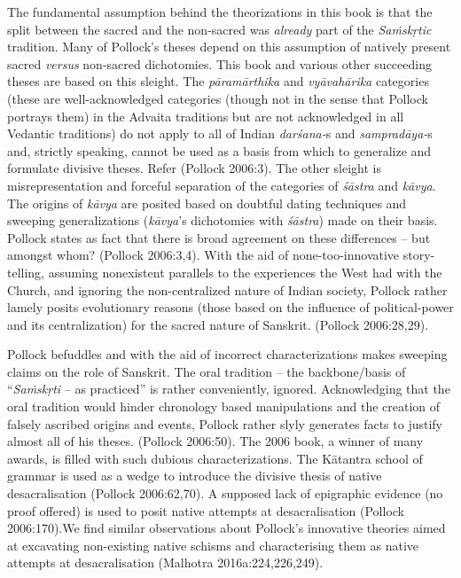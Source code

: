 The fundamental assumption behind the theorizations in this book is that the split between the sacred and the non-sacred was \textit{already} part of the \textit{Saṁskṛtic} tradition. Many of Pollock's theses depend on this assumption of natively present sacred \textit{versus} non-sacred dichotomies. This book and various other succeeding theses are based on this sleight. The \textit{pāramārthika} and \textit{vyāvahārika} categories (these are well-acknowledged categories (though not in the sense that Pollock portrays them) in the Advaita traditions but are not acknowledged in all Vedantic traditions) do not apply to all of Indian \textit{darśana-}s and \textit{sampradāya-}s and, strictly speaking, cannot be used as a basis from which to generalize and formulate divisive theses. Refer (Pollock 2006:3). The other sleight is misrepresentation and forceful separation of the categories of \textit{śāstra} and \textit{kāvya}. The origins of \textit{kāvya} are posited based on doubtful dating techniques and sweeping generalizations (\textit{kāvya}'s dichotomies with \textit{śāstra}) made on their basis. Pollock states as fact that there is broad agreement on these differences – but amongst whom? (Pollock 2006:3,4). With the aid of none-too-innovative story-telling, assuming nonexistent parallels to the experiences the West had with the Church, and ignoring the non-centralized nature of Indian society, Pollock rather lamely posits evolutionary reasons (those based on the influence of political-power and its centralization) for the sacred nature of Sanskrit. (Pollock 2006:28,29).

Pollock befuddles and with the aid of incorrect characterizations makes sweeping claims on the role of Sanskrit. The oral tradition – the backbone/basis of “\textit{Saṁskṛti} – as practiced” is rather conveniently, ignored. Acknowledging that the oral tradition would hinder chronology based manipulations and the creation of falsely ascribed origins and events, Pollock rather slyly generates facts to justify almost all of his theses. (Pollock 2006:50). The 2006 book, a winner of many awards, is filled with such dubious characterizations. The Kātantra school of grammar is used as a wedge to introduce the divisive thesis of native desacralisation (Pollock 2006:62,70). A supposed lack of epigraphic evidence (no proof offered) is used to posit native attempts at desacralisation (Pollock 2006:170).We find similar observations about Pollock's innovative theories aimed at excavating non-existing native schisms and characterising them as native attempts at desacralisation (Malhotra 2016a:224,226,249).



